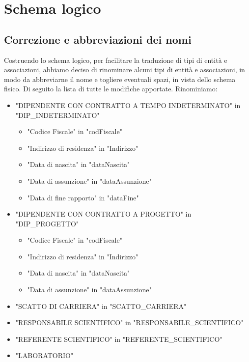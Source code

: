 \chapter{Schema logico}
    \section{Correzione e abbreviazioni dei nomi}
        Costruendo lo schema logico, per facilitare la traduzione di tipi di entità e associazioni, abbiamo deciso di rinominare alcuni tipi di entità e associazioni, in modo da abbreviarne il nome e togliere eventuali spazi, in vista dello schema fisico. Di seguito la lista di tutte le modifiche apportate. Rinominiamo:
        \begin{itemize}
            \item "DIPENDENTE CON CONTRATTO A TEMPO INDETERMINATO" in "DIP\_INDETERMINATO"
                \begin{itemize}
                    \item "Codice Fiscale" in "codFiscale"
                    \item "Indirizzo di residenza" in "Indirizzo"
                    \item "Data di nascita" in "dataNascita"
                    \item "Data di assunzione" in "dataAssunzione"
                    \item "Data di fine rapporto" in "dataFine"
                \end{itemize}
            \item "DIPENDENTE CON CONTRATTO A PROGETTO" in "DIP\_PROGETTO"
                \begin{itemize}
                    \item "Codice Fiscale" in "codFiscale"
                    \item "Indirizzo di residenza" in "Indirizzo"
                    \item "Data di nascita" in "dataNascita"
                    \item "Data di assunzione" in "dataAssunzione"
                \end{itemize}
            \item "SCATTO DI CARRIERA" in "SCATTO\_CARRIERA"
            \item "RESPONSABILE SCIENTIFICO" in "RESPONSABILE\_SCIENTIFICO"
            \item "REFERENTE SCIENTIFICO" in "REFERENTE\_SCIENTIFICO"
            \item "LABORATORIO"

\end{itemize}
